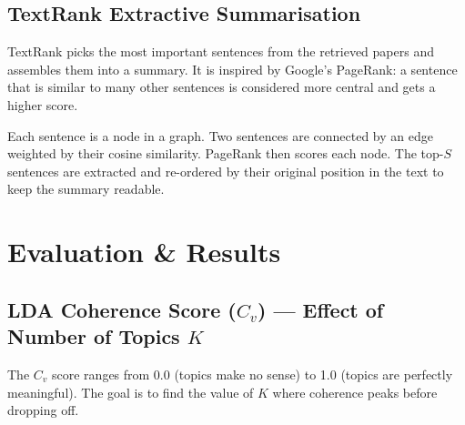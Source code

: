 \documentclass[11pt,a4paper]{article}
\begin{document}
\subsection{TextRank Extractive Summarisation}

TextRank picks the most important sentences from the retrieved papers and assembles them into a summary. It is inspired by Google's PageRank: a sentence that is similar to many other sentences is considered more central and gets a higher score.

\begin{center}
\end{center}

Each sentence is a node in a graph. Two sentences are connected by an edge weighted by their cosine similarity. PageRank then scores each node. The top-$S$ sentences are extracted and re-ordered by their original position in the text to keep the summary readable.

\section{Evaluation \& Results}

\subsection{LDA Coherence Score ($C_v$) --- Effect of Number of Topics $K$}

\begin{infobox}
The $C_v$ score ranges from 0.0 (topics make no sense) to 1.0 (topics are perfectly meaningful). The goal is to find the value of $K$ where coherence peaks before dropping off.
\end{infobox}
\end{document}
